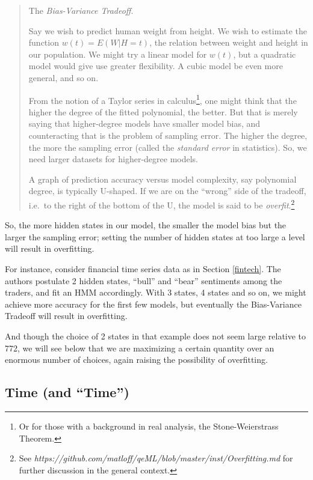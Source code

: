 \documentclass[11pt]{article}
\begin{document}
\begin{quote}

The \textit{Bias-Variance Tradeoff}.  

Say we wish to predict human weight from height.  We wish to estimate
the function $w(t) = E(W | H = t)$, the relation between weight and
height in our population.  We might try a linear model for $w(t)$, but a
quadratic model would give use greater flexibility.  A cubic model be
even more general, and so on.

From the notion of a Taylor series in calculus\footnote{Or for those
with a background in real analysis, the Stone-Weierstrass Theorem.},
one might think that the higher the degree of the fitted polynomial, the
better.  But that is merely saying that higher-degree models have
smaller model bias, and counteracting that is the problem of sampling
error.  The higher the degree, the more the sampling error (called the
\textit{standard error} in statistics).  So, we need larger datasets
for higher-degree models.

A graph of prediction accuracy versus model complexity, say polynomial
degree, is typically U-shaped.  If we are on the ``wrong'' side of the
tradeoff, i.e.\ to the right of the bottom of the U, the model is said
to be \textit{overfit}.\footnote{See
\textit{https://github.com/matloff/qeML/blob/master/inst/Overfitting.md}
for further discussion in the general context.}

\end{quote}

So, the more hidden states in our model, the smaller the model bias but
the larger the sampling error; setting the number of hidden states at too
large a level will result in overfitting.

For instance, consider financial time series data as in Section
\ref{fintech}.  The authors postulate 2 hidden states, ``bull'' and
``bear'' sentiments among the traders, and fit an HMM accordingly.  With
3 states, 4 states and so on, we might achieve more accuracy for the
first few models, but eventually the Bias-Variance Tradeoff will result
in overfitting.

And though the choice of 2 states in that example does not seem large
relative to 772, we will see below that we are maximizing a certain
quantity over an enormous number of choices, again raising the
possibility of overfitting.

\subsection{Time (and ``Time'')}
\end{document}
